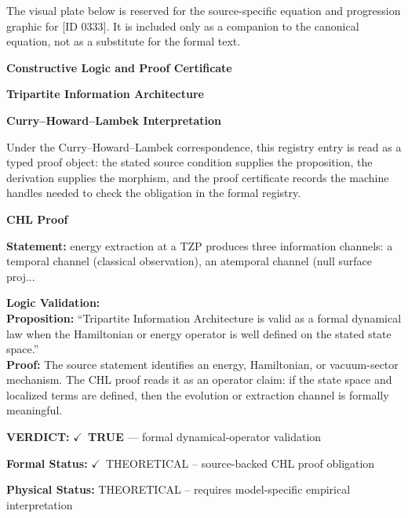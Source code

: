 \begingroup\footnotesize\sloppy
The visual plate below is reserved for the source-specific equation and progression graphic for [ID 0333]. It is included only as a companion to the canonical equation, not as a substitute for the formal text.
\par\endgroup
\ifTZPDarkEdition
{}
\fi

\clearpage
\begingroup\tzpsupportsetup
\noindent\textbf{\fontsize{10.8pt}{12.8pt}\selectfont [ID 0333] Constructive Logic and Proof Certificate}\par
\noindent\textbf{\fontsize{10pt}{12pt}\selectfont Tripartite Information Architecture}\par
\vspace{0.45em}
\begingroup
\footnotesize
\setlength{\parskip}{0.22em}
\setlength{\parindent}{0pt}
\noindent\textbf{Curry--Howard--Lambek Interpretation}\par
Under the Curry--Howard--Lambek correspondence, this registry entry is read as a typed proof
object: the stated source condition supplies the proposition, the derivation supplies the
morphism, and the proof certificate records the machine handles needed to check the obligation
in the formal registry.

\vspace{0.45em}
\noindent\textbf{CHL Proof}\par
\textbf{Statement:} energy extraction at a TZP produces three information channels: a temporal channel
(classical observation), an atemporal channel (null surface proj...

\textbf{Logic Validation:}\\
\textbf{Proposition:} ``Tripartite Information Architecture is valid as a formal dynamical law when the
Hamiltonian or energy operator is well defined on the stated state space.''\\
\textbf{Proof:} The source statement identifies an energy, Hamiltonian, or vacuum-sector mechanism. The
CHL proof reads it as an operator claim: if the state space and localized terms are
defined, then the evolution or extraction channel is formally meaningful.

\textbf{VERDICT:} \ensuremath{\checkmark}\ \textbf{TRUE} --- formal dynamical-operator validation

\textbf{Formal Status:} \ensuremath{\checkmark}\ THEORETICAL -- source-backed CHL proof obligation

\textbf{Physical Status:} THEORETICAL -- requires model-specific empirical interpretation
\par\vspace{0.45em}
\par
\ifTZPDarkEdition
{}
\fi
\endgroup
\endgroup
